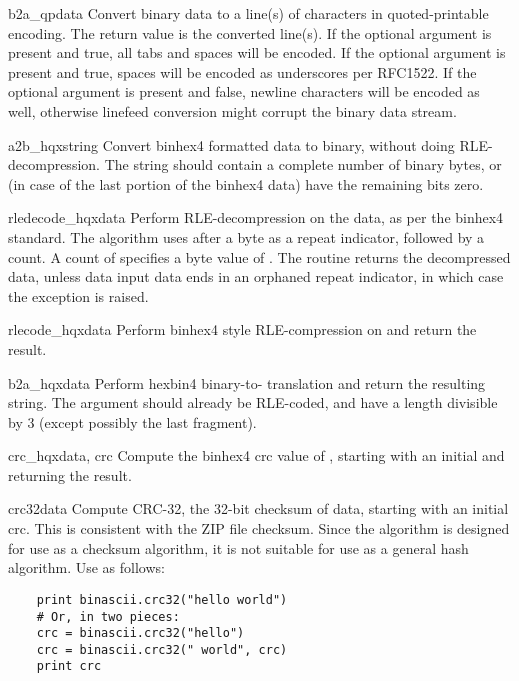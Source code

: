 \begin{funcdesc}{b2a_qp}{data}
Convert binary data to a line(s) of \ASCII{} characters in
quoted-printable encoding.  The return value is the converted line(s).
If the optional argument  is present and true, all tabs
and spaces will be encoded.  If the optional argument  is
present and true, spaces will be encoded as underscores per RFC1522.
If the optional argument  is present and false, newline
characters will be encoded as well, otherwise linefeed conversion might
corrupt the binary data stream.
\end{funcdesc}

\begin{funcdesc}{a2b_hqx}{string}
Convert binhex4 formatted \ASCII{} data to binary, without doing
RLE-decompression. The string should contain a complete number of
binary bytes, or (in case of the last portion of the binhex4 data)
have the remaining bits zero.
\end{funcdesc}

\begin{funcdesc}{rledecode_hqx}{data}
Perform RLE-decompression on the data, as per the binhex4
standard. The algorithm uses  after a byte as a repeat
indicator, followed by a count. A count of  specifies a byte
value of . The routine returns the decompressed data,
unless data input data ends in an orphaned repeat indicator, in which
case the  exception is raised.
\end{funcdesc}

\begin{funcdesc}{rlecode_hqx}{data}
Perform binhex4 style RLE-compression on  and return the
result.
\end{funcdesc}

\begin{funcdesc}{b2a_hqx}{data}
Perform hexbin4 binary-to-\ASCII{} translation and return the
resulting string. The argument should already be RLE-coded, and have a
length divisible by 3 (except possibly the last fragment).
\end{funcdesc}

\begin{funcdesc}{crc_hqx}{data, crc}
Compute the binhex4 crc value of , starting with an initial
 and returning the result.
\end{funcdesc}

\begin{funcdesc}{crc32}{data}
Compute CRC-32, the 32-bit checksum of data, starting with an initial
crc.  This is consistent with the ZIP file checksum.  Since the
algorithm is designed for use as a checksum algorithm, it is not
suitable for use as a general hash algorithm.  Use as follows:
\begin{verbatim}
    print binascii.crc32("hello world")
    # Or, in two pieces:
    crc = binascii.crc32("hello")
    crc = binascii.crc32(" world", crc)
    print crc
\end{verbatim}
\end{funcdesc}
 
